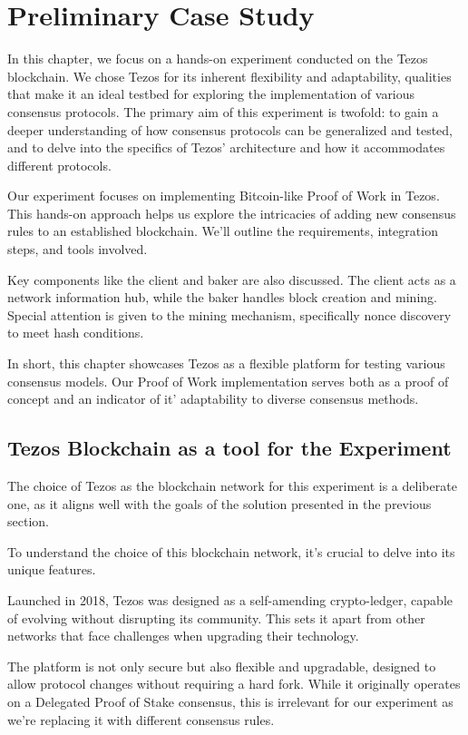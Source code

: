 \chapter{Preliminary Case Study}

In this chapter, we focus on a hands-on experiment conducted on the Tezos blockchain. We chose Tezos for its inherent flexibility and adaptability, qualities that make it an ideal testbed for exploring the implementation of various consensus protocols. The primary aim of this experiment is twofold: to gain a deeper understanding of how consensus protocols can be generalized and tested, and to delve into the specifics of Tezos' architecture and how it accommodates different protocols.

Our experiment focuses on implementing Bitcoin-like Proof of Work in Tezos. This hands-on approach helps us explore the intricacies of adding new consensus rules to an established blockchain. We'll outline the requirements, integration steps, and tools involved.

Key components like the client and baker are also discussed. The client acts as a network information hub, while the baker handles block creation and mining. Special attention is given to the mining mechanism, specifically nonce discovery to meet hash conditions.

In short, this chapter showcases Tezos as a flexible platform for testing various consensus models. Our Proof of Work implementation serves both as a proof of concept and an indicator of it' adaptability to diverse consensus methods.

\section{Tezos Blockchain as a tool for the Experiment}
The choice of Tezos as the blockchain network for this experiment is a deliberate one, as it aligns well with the goals of the solution presented in the previous section.

To understand the choice of this blockchain network, it's crucial to delve into its unique features.

Launched in 2018, Tezos was designed as a self-amending crypto-ledger, capable of evolving without disrupting its community. This sets it apart from other networks that face challenges when upgrading their technology.

The platform is not only secure but also flexible and upgradable, designed to allow protocol changes without requiring a hard fork. While it originally operates on a Delegated Proof of Stake consensus, this is irrelevant for our experiment as we're replacing it with different consensus rules.

